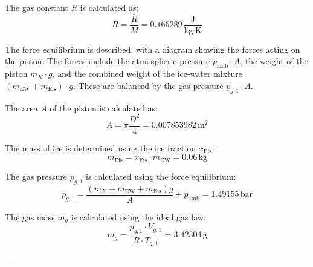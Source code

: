 The gas constant \( R \) is calculated as:  
\[
R = \frac{\bar{R}}{M} = 0.166289 \, \frac{\text{J}}{\text{kg·K}}
\]

The force equilibrium is described, with a diagram showing the forces acting on the piston. The forces include the atmospheric pressure \( p_{\text{amb}} \cdot A \), the weight of the piston \( m_K \cdot g \), and the combined weight of the ice-water mixture \( (m_{\text{EW}} + m_{\text{Eis}}) \cdot g \). These are balanced by the gas pressure \( p_{g,1} \cdot A \).  

The area \( A \) of the piston is calculated as:  
\[
A = \pi \frac{D^2}{4} = 0.007853982 \, \text{m}^2
\]

The mass of ice is determined using the ice fraction \( x_{\text{Eis}} \):  
\[
m_{\text{Eis}} = x_{\text{Eis}} \cdot m_{\text{EW}} = 0.06 \, \text{kg}
\]

The gas pressure \( p_{g,1} \) is calculated using the force equilibrium:  
\[
p_{g,1} = \frac{(m_K + m_{\text{EW}} + m_{\text{Eis}}) g}{A} + p_{\text{amb}} = 1.49155 \, \text{bar}
\]

The gas mass \( m_g \) is calculated using the ideal gas law:  
\[
m_g = \frac{p_{g,1} \cdot V_{g,1}}{R \cdot T_{g,1}} = 3.42304 \, \text{g}
\]

---